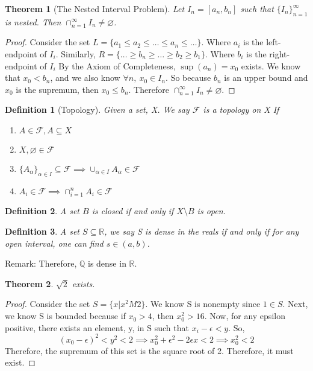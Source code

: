 \documentclass[12pt,reqno]{amsart}
\theoremstyle{plain}
\newtheorem*{definition}{Definition}
\newtheorem*{theorem}{Theorem}
\begin{document}
    \begin{theorem}[The Nested Interval Problem]
        Let $I_n = [a_n, b_n]$ such that ${\{I_n\}}_{n=1}^\infty$ is nested. Then $\cap^\infty_{n=1}I_n \neq \varnothing$.
    \end{theorem}
    \begin{proof}
        Consider the set $L = {\{ a_1 \le a_2 \le \dots \le a_n \le \dots \}}$. Where $a_i$ is the left-endpoint of $I_i$.
        Similarly, $R = {\{ \dots \ge b_n \ge \dots \ge b_2 \ge b_1\}}$. Where $b_i$ is the right-endpoint of $I_i$
        By the Axiom of Completeness, $\sup(a_n) = x_0$ exists.
        We know that $x_0 < b_n$, and we also know $\forall n,\ x_0 \in I_n$.
        So because $b_n$ is an upper bound and $x_0$ is the supremum, then $x_0 \le b_n$. Therefore $\cap^\infty_{n=1}I_n \neq \varnothing$.
    \end{proof}

    \begin{definition}[Topology]
        Given a set, X. We say $\mathcal{F}$ is a topology on X If
        \begin{enumerate}
            \item $A \in \mathcal{F}, A \subseteq X$
            \item $X, \varnothing \in \mathcal{F}$
            \item ${\{A_\alpha\}}_{\alpha\in I} \subseteq \mathcal{F} \implies \cup_{\alpha \in I}A_\alpha \in \mathcal{F}$
            \item $A_i \in \mathcal{F} \implies \cap^n_{i=1}A_i \in \mathcal{F}$
        \end{enumerate}
    \end{definition}

    \begin{definition}
        A set $B$ is closed if and only if $X\setminus B$ is open.
    \end{definition}

    \begin{definition}
        A set $S \subseteq \mathbb R$, we say S is dense in the reals if and only if for any open interval, one can find $s \in (a,b)$.
    \end{definition}

    Remark: Therefore, $\mathbb{Q}$ is dense in $\mathbb{R}$.

    \begin{theorem}
        $\sqrt2$ exists.
    \end{theorem}
    \begin{proof}
        Consider the set $S = {\{  x \vert x^2 M 2 \}}$.
        We know S is nonempty since $1 \in S$. 
        Next, we know S is bounded because if $x_0 > 4$, then $x_0^2 > 16$.
        Now, for any epsilon positive, there exists an element, y, in S such that $x_i - \epsilon < y$.
        So,
        \[ {(x_0 - \epsilon)}^2 < y^2 < 2 \implies x_0^2 + \epsilon^2 - 2\epsilon x < 2 \implies x_0^2 < 2\]
        Therefore, the supremum of this set is the square root of 2. Therefore, it must exist.
    \end{proof}
\end{document}
